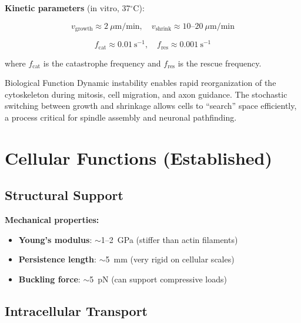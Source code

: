 \textbf{Kinetic parameters} (in vitro, 37$^\circ$C):

\begin{equation}
v_{\text{growth}} \approx 2~\mu\text{m/min}, \quad v_{\text{shrink}} \approx 10\text{--}20~\mu\text{m/min}
\label{eq:growth-shrink-rates}
\end{equation}

\begin{equation}
f_{\text{cat}} \approx 0.01~\text{s}^{-1}, \quad f_{\text{res}} \approx 0.001~\text{s}^{-1}
\label{eq:catastrophe-rescue-freq}
\end{equation}

where $f_{\text{cat}}$ is the catastrophe frequency and $f_{\text{res}}$ is the rescue frequency.

\begin{calloutbox}{Biological Function}
Dynamic instability enables rapid reorganization of the cytoskeleton during mitosis, cell migration, and axon guidance. The stochastic switching between growth and shrinkage allows cells to ``search'' space efficiently, a process critical for spindle assembly and neuronal pathfinding.
\end{calloutbox}

\section{Cellular Functions (Established)}
\label{sec:cellular-functions}

\subsection{Structural Support}\label{structural-support}

\textbf{Mechanical properties:}
\begin{itemize}
\item \textbf{Young's modulus}: $\sim$1--2~GPa (stiffer than actin filaments)
\item \textbf{Persistence length}: $\sim$5~mm (very rigid on cellular scales)
\item \textbf{Buckling force}: $\sim$5~pN (can support compressive loads)
\end{itemize}

\subsection{Intracellular Transport}

